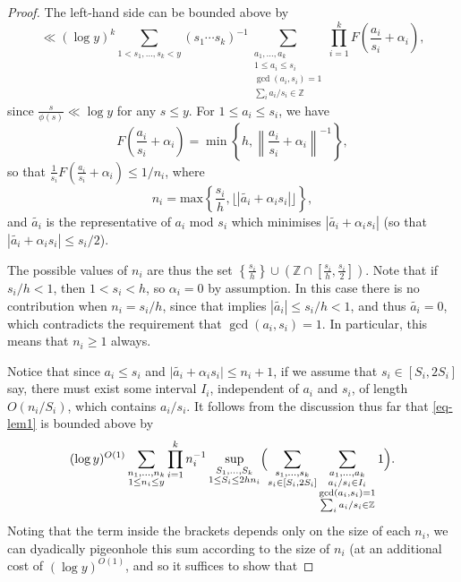 \documentclass[11pt,letterpaper]{amsart}
\newcommand{\ogcd}[2]{\gcd(#1,#2)}
\theoremstyle{definition}
\begin{document}
\begin{proof}
The left-hand side can be bounded above by
\begin{equation}\label{eq-lem1}
\ll (\log y)^k \sum_{1 < s_1, \dots, s_k < y} (s_1 \cdots s_k)^{-1} \sum_{\substack{a_1, \dots, a_k \\ 1 \le a_i \le s_i \\ \ogcd{a_i}{s_i} = 1 \\ \sum_i a_i/s_i \in \mathbb Z}} \prod_{i=1}^k F\left(\frac{a_i}{s_i} + \alpha_i\right),
\end{equation}
since $\frac{s}{\phi(s)} \ll \log y$ for any $s \le y$. For $1 \le a_i \le s_i$, we have
\begin{equation*}
F\left(\frac{a_i}{s_i} +\alpha_i \right) = \min\left\{h, \left\|\frac{a_i}{s_i}+\alpha_i\right\|^{-1}\right\},
\end{equation*}
so that $\frac 1{s_i} F\left(\frac{a_i}{s_i}+\alpha_i\right) \le 1/n_i$, where
\begin{equation*}
n_i = \mathrm{max}\left\{\frac{s_i}{h}, \lfloor |\tilde{a_i} + \alpha_i s_i|\rfloor \right\},
\end{equation*}
and $\tilde{a_i}$ is the representative of $a_i$ mod $s_i$ which minimises $|\tilde{a_i} + \alpha_i s_i|$ (so that $|\tilde{a_i} + \alpha_i s_i|\leq s_i/2$). 

The possible values of $n_i$ are thus the set $\left\{\frac{s_i}{h}\right\} \cup \left(\mathbb Z \cap \left[\frac{s_i}{h},\frac{s_i}{2}\right]\right)$. 
Note that if $s_i/h < 1$, then $1 < s_i < h$, so $\alpha_i = 0$ by assumption. In this case there is no contribution when $n_i = s_i/h$, since that implies $|\tilde{a_i}| \le s_i/h < 1$, and thus $\tilde{a_i} = 0$, which contradicts the requirement that $\ogcd{a_i}{s_i} = 1$. In particular, this means that $n_i \ge 1$ always. 


Notice that since $a_i\leq s_i$ and $\lvert \tilde{a_i}+\alpha_is_i\rvert \leq n_i+1$, if we assume that $s_i\in [S_i,2S_i]$ say, there must exist some interval $I_i$, independent of $a_i$ and $s_i$, of length $O(n_i/S_i)$, which contains $a_i/s_i$. It follows from the discussion thus far that \eqref{eq-lem1} is bounded above by 
\[(\log y)^{O(1)}\sum_{\substack{n_1,\ldots,n_k\\ 1\leq n_i\leq y}}\prod_{i=1}^kn_i^{-1}\sup_{\substack{S_1,\ldots,S_k\\ 1\leq S_i\leq 2hn_i}} \Bigl(\sum_{\substack{s_1, \dots, s_k \\s_i\in [S_i,2S_i]}}\sum_{\substack{a_1, \dots, a_k \\ a_i/s_i \in I_i \\ \ogcd{a_i}{s_i} = 1 \\ \sum_i a_i/s_i \in \mathbb Z}}1\Bigr). \]
Noting that the term inside the brackets depends only on the size of each $n_i$, we can dyadically pigeonhole this sum according to the size of $n_i$ (at an additional cost of $(\log y)^{O(1)}$, and so it suffices to show that 


\end{proof}
\end{document}
